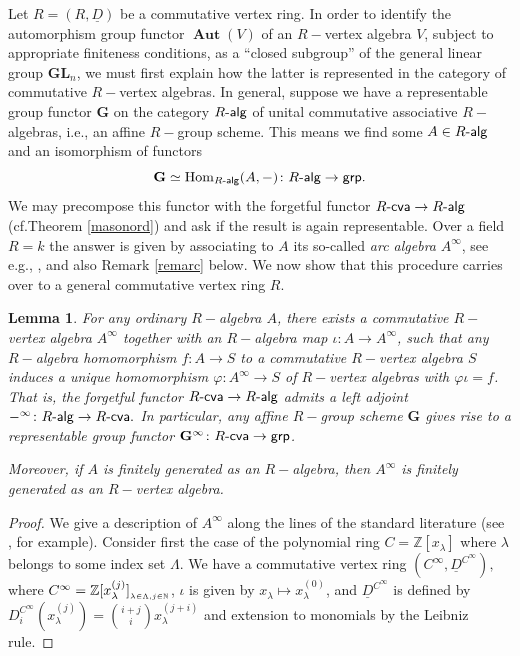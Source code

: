 \documentclass{article}
\newtheorem{lem}[thm]{Lemma}
\theoremstyle{definition}
\def\Hom{\ensuremath{\operatorname{Hom}}}
\def\BAut{\ensuremath{\operatorname{\mathbf{Aut}}}}
\def\Rcva{\ensuremath{R\text{-\textup{\textsf{cva}}}}}
\def\grp{\ensuremath{\text{\textup{\textsf{grp}}}}}
\def\Ralg{\ensuremath{R\text{-\textup{\textsf{alg}}}}}
\def\BG{\ensuremath{\mathbf{G}}}
\def\BGL{\ensuremath{\mathbf{G}\mathbf{L}}}
\def\Z{\ensuremath{\mathbb Z}}
\def\uD{\ensuremath{\underline{D}}}
\begin{document}
 {\rm Let $R = (R, \underline D)$ be a commutative vertex ring.
In order to identify the automorphism group functor $\BAut(V)$ of an $R-$vertex algebra $V$, subject to appropriate finiteness conditions, as a ``closed subgroup'' of the general linear group $\BGL_n$, we must first explain how the latter is represented in the category of commutative $R-$vertex algebras.
In general, suppose we have a representable group functor $\BG$ on the category $\Ralg$ of unital commutative associative $R-$algebras, i.e., an affine $R-$group scheme.
This means we find some $A \in \Ralg$ and an isomorphism of functors
\[ \BG \simeq \Hom_{\Ralg}(A,-) \colon \Ralg \to \grp. \]
We may precompose this functor with the forgetful functor $\Rcva \to \Ralg$ (cf.\@ Theorem \ref{masonord}) and ask if the result is again representable.
Over a field $R = k$ the answer is given by associating to $A$ its so-called \emph{arc algebra} $A^\infty$, see e.g.\@ \cite[Rem.\@ 3.1]{EM}, \cite[Sec.\@ 3.3]{B},  and also Remark \ref{remarc} below. We now show that this procedure carries over to a general commutative vertex ring $R$.


\begin{lem}\label{jetlem}
    For any ordinary $R-$algebra $A$, there exists a  commutative $R-$vertex algebra $A^\infty$ together with an $R-$algebra map $\iota \colon A \to A^\infty$, such that any $R-$algebra homomorphism $f \colon A \to S$ to a commutative $R-$vertex algebra $S$ induces a unique homomorphism $\varphi \colon A^\infty \to S$ of $R-$vertex algebras with $\varphi \iota = f$.
    That is, the forgetful functor $\Rcva \to \Ralg$ admits a left adjoint $-^\infty \colon \Ralg \to \Rcva.$ In particular, any affine $R-$group scheme $\mathbf G$ gives rise to a representable group functor $\mathbf G^\infty \colon \Rcva \to \grp$.

    Moreover, if $A$ is finitely generated as an $R-$algebra, then $A^\infty$ is finitely generated as an $R-$vertex algebra.
\end{lem}

\begin{proof}
We give a description of $A^\infty$ along the lines of the standard literature (see \cite{Voj}, for example). 
	Consider first the case of the polynomial ring  $C = \Z[x_\lambda]$ where $\lambda$ belongs to some index set  $\Lambda.$ We have a commutative vertex ring $(C^\infty, \uD^{C^\infty}),$ where $C^\infty = \Z[x_\lambda^{(j)}]_{_{\lambda \in \Lambda, j \in \Bbb{N}}}$, $\iota$ is given by $x_\lambda \mapsto x_\lambda^{(0)}$,  and  $\underline{D}^{C^\infty}$ is defined by $D^{C^\infty}_i(x_\lambda^{(j)}) =  \binom{i+j}{i}  x_\lambda^{(j +i)}$ and extension to monomials by the Leibniz rule. 


\end{proof}}
\end{document}
